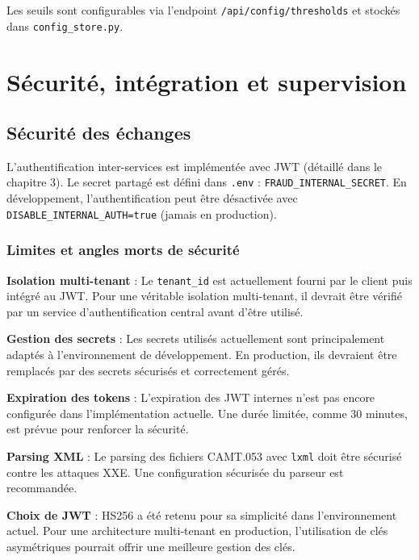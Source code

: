 \documentclass[12pt,a4paper]{extreport}
\begin{document}
Les seuils sont configurables via l'endpoint \texttt{/api/config/thresholds} et stockés dans \texttt{config\_store.py}.



\chapter{Sécurité, intégration et supervision}

\section{Sécurité des échanges}

L'authentification inter-services est implémentée avec JWT (détaillé dans le chapitre 3). Le secret partagé est défini dans \texttt{.env} : \texttt{FRAUD\_INTERNAL\_SECRET}. En développement, l'authentification peut être désactivée avec \texttt{DISABLE\_INTERNAL\_AUTH=true} (jamais en production).

\subsection{Limites et angles morts de sécurité}

\textbf{Isolation multi-tenant} : Le \texttt{tenant\_id} est actuellement fourni par le client puis intégré au JWT. Pour une véritable isolation multi-tenant, il devrait être vérifié par un service d'authentification central avant d'être utilisé.

\textbf{Gestion des secrets} : Les secrets utilisés actuellement sont principalement adaptés à l'environnement de développement. En production, ils devraient être remplacés par des secrets sécurisés et correctement gérés.

\textbf{Expiration des tokens} : L'expiration des JWT internes n'est pas encore configurée dans l'implémentation actuelle. Une durée limitée, comme 30 minutes, est prévue pour renforcer la sécurité.

\textbf{Parsing XML} : Le parsing des fichiers CAMT.053 avec \texttt{lxml} doit être sécurisé contre les attaques XXE. Une configuration sécurisée du parseur est recommandée.

\textbf{Choix de JWT} : HS256 a été retenu pour sa simplicité dans l'environnement actuel. Pour une architecture multi-tenant en production, l'utilisation de clés asymétriques pourrait offrir une meilleure gestion des clés.
\end{document}
